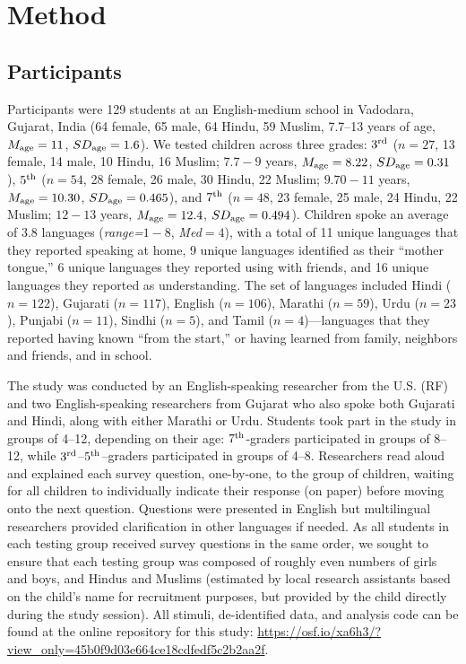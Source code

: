 \documentclass{foushee-adapted-preprint}
\begin{document}
\section*{Method}
\subsection*{Participants}
Participants were 129 students at an English-medium school in Vadodara, Gujarat, India (64 female, 65 male, 64 Hindu, 59 Muslim, 7.7--13 years of age, $M_{\textnormal{age}}=11$, $SD_{\textnormal{age}}=1.6$). 
We tested children across three grades: $3^{\textnormal{rd}}$ ($n=27$, 13 female, 14 male, 10 Hindu, 16 Muslim; $7.7-9$ years, $M_{\textnormal{age}}=8.22$, $SD_{\textnormal{age}}=0.31$), $5^{\textnormal{th}}$ ($n=54$, 28 female, 26 male, 30 Hindu, 22 Muslim; $9.70-11$ years, $M_{\textnormal{age}}=10.30$, $SD_{\textnormal{age}}=0.465$), and $7^{\textnormal{th}}$ ($n=48$, 23 female, 25 male, 24 Hindu, 22 Muslim; $12-13$ years, $M_{\textnormal{age}}=12.4$, $SD_{\textnormal{age}}=0.494$). 
Children spoke an average of 3.8 languages (\textit{range=}$1-8$, \textit{Med}$=4$), with a total of 11 unique languages that they reported speaking at home, 9 unique languages identified as their ``mother tongue,'' 6 unique languages they reported using with friends, and 16 unique languages they reported as understanding. The set of languages included Hindi ($n=122$), Gujarati ($n=117$), English ($n=106$), Marathi ($n=59$), Urdu ($n=23$), Punjabi ($n=11$), Sindhi ($n=5$), and Tamil ($n=4$)---languages that they reported having known ``from the start,'' or having learned from family, neighbors and friends, and in school.

The study was conducted by an English-speaking researcher from the U.S. (RF) and two English-speaking researchers from Gujarat who also spoke both Gujarati and Hindi, along with either Marathi or Urdu. Students took part in the study in groups of 4--12, depending on their age: $7^{\textnormal{th}}$-graders participated in groups of 8--12, while $3^{\textnormal{rd}}$--$5^{\textnormal{th}}$--graders participated in groups of 4--8. Researchers read aloud and explained each survey question, one-by-one, to the group of children, waiting for all children to individually indicate their response (on paper) before moving onto the next question. Questions were presented in English but multilingual researchers provided clarification in other languages if needed. As all students in each testing group received survey questions in the same order, we sought to ensure that each testing group was composed of roughly even numbers of girls and boys, and Hindus and Muslims (estimated by local research assistants based on the child's name for recruitment purposes, but provided by the child directly during the study session). 
All stimuli, de-identified data, and analysis code can be found at the online repository for this study: \url{https://osf.io/xa6h3/?view_only=45b0f9d03e664ce18cdfedf5c2b2aa2f}. 
\end{document}
